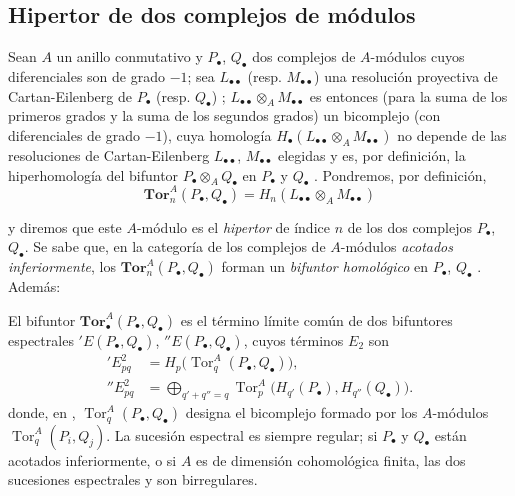 \subsection{Hipertor de dos complejos de módulos}
\label{subsection:III.6.3}
\label{subsection:III.6.3.fr}

\begin{env}[6.3.1]
\label{III.6.3.1}
Sean $A$ un anillo conmutativo y $P_\bullet$, $Q_\bullet$ dos complejos de
$A$-módulos cuyos diferenciales son de grado $-1$; sea
$L_{\bullet\bullet}$ (resp. $M_{\bullet\bullet}$) una resolución proyectiva
de Cartan-Eilenberg de $P_\bullet$ (resp. $Q_\bullet$)
;
$L_{\bullet\bullet}\otimes_A M_{\bullet\bullet}$ es entonces (para la suma
de los primeros grados y la suma de los segundos grados) un bicomplejo (con
diferenciales de grado $-1$), cuya homología
$H_\bullet(L_{\bullet\bullet}\otimes_A M_{\bullet\bullet})$ no depende de las
resoluciones de Cartan-Eilenberg $L_{\bullet\bullet}$,
$M_{\bullet\bullet}$ elegidas y es, por definición, la hiperhomología del
bifuntor $P_\bullet\otimes_A Q_\bullet$ en $P_\bullet$ y $Q_\bullet$
. Pondremos, por definición,
\[
  \mathbf{Tor}_n^A(P_\bullet,Q_\bullet)
  =H_n(L_{\bullet\bullet}\otimes_A M_{\bullet\bullet})
  \tag{6.3.1.1}\label{III.6.3.1.1.fr}
\]


y diremos que este $A$-módulo es el \emph{hipertor} de índice $n$ de los dos
complejos $P_\bullet$, $Q_\bullet$. Se sabe que, en la categoría de los
complejos de $A$-módulos \emph{acotados inferiormente}, los
$\mathbf{Tor}_n^A(P_\bullet,Q_\bullet)$ forman un \emph{bifuntor homológico} en
$P_\bullet$, $Q_\bullet$ . Además:
\end{env}

\begin{proposition}[6.3.2]
\label{III.6.3.2}
El bifuntor $\mathbf{Tor}_\bullet^A(P_\bullet,Q_\bullet)$ es el término
límite común de dos bifuntores espectrales
$'E(P_\bullet,Q_\bullet)$, $''E(P_\bullet,Q_\bullet)$, cuyos términos $E_2$
son
\begin{align}
  'E^2_{pq}
    &=H_p\bigl(\operatorname{Tor}_q^A(P_\bullet,Q_\bullet)\bigr),
    \tag{6.3.2.1}\label{III.6.3.2.1.fr}\\
  ''E^2_{pq}
    &=\bigoplus_{q'+q''=q}
      \operatorname{Tor}_p^A\bigl(H_{q'}(P_\bullet),H_{q''}(Q_\bullet)\bigr).
    \tag{6.3.2.2}\label{III.6.3.2.2.fr}
\end{align}
donde, en ,
$\operatorname{Tor}_q^A(P_\bullet,Q_\bullet)$ designa el
bicomplejo formado por los $A$-módulos $\operatorname{Tor}_q^A(P_i,Q_j)$. La
sucesión espectral  es siempre regular; si $P_\bullet$ y
$Q_\bullet$
están acotados inferiormente, o si $A$ es de dimensión cohomológica finita,
las dos sucesiones espectrales  y
 son birregulares.
\end{proposition}

